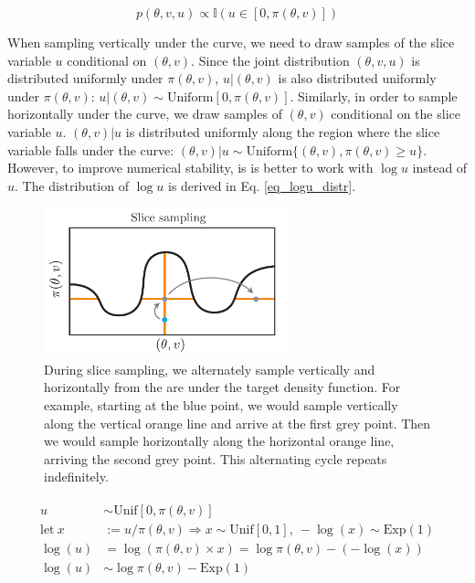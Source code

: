 \documentclass[12pt]{article}
\begin{document}
{\begin{equation}
p(\theta, v, u) \propto \mathbb{I}\left(u \in\left[0, \pi(\theta, v) \right]\right)
\end{equation}

When sampling vertically under the curve, we need to draw samples of the slice variable $u$ conditional on $(\theta, v)$. Since the joint distribution $(\theta, v, u)$ is distributed uniformly under $\pi(\theta, v)$, $u|(\theta, v)$ is also distributed uniformly under $\pi(\theta, v)$: $u|(\theta, v) \sim \text{Uniform}[0, \pi(\theta, v)]$. Similarly, in order to sample horizontally under the curve, we draw samples of $(\theta, v)$ conditional on the slice variable $u$. $(\theta, v)|u$ is distributed uniformly along the region where the slice variable falls under the curve: $(\theta, v) | u \sim \text{Uniform}\{(\theta, v), \pi(\theta, v) \geq u\}$. However, to improve numerical stability, is is better to work with $\log u$ instead of $u$. The distribution of $\log u$ is derived in Eq. \ref{eq_logu_distr}.

\begin{figure}[H]
\centering
\includegraphics[width=7cm]{illustrations/slice_sampling.pdf}
\caption{During slice sampling, we alternately sample vertically and horizontally from the are under the target density function. For example, starting at the blue point, we would sample vertically along the vertical orange line and arrive at the first grey point. Then we would sample horizontally along the horizontal orange line, arriving the second grey point. This alternating cycle repeats indefinitely.}
\label{fig_slice_sampling}
\end{figure}


\begin{align}
\begin{split}
u &\sim \text{Unif}[0, \pi(\theta, v)] \\
\text{let} \ x &:= u/\pi(\theta, v) \Rightarrow x \sim \text{Unif}[0, 1], \  -\log(x) \sim \text{Exp}(1) \\
\log(u) &= \log(\pi(\theta, v) \times x) = \log\pi(\theta, v) - (-\log(x)) \\
\log(u) &\sim \log \pi(\theta, v) - \text{Exp}(1)
\end{split}
\label{eq_logu_distr}
\end{align}


}
\end{document}
